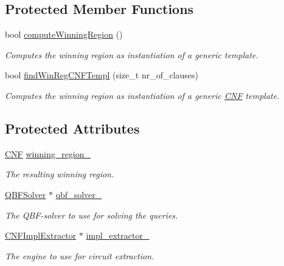\subsection*{Protected Member Functions}
\begin{DoxyCompactItemize}
\item 
bool \hyperlink{classTemplateSynth_ae334e4a6c30a324cfd4d0c05a32b191c}{compute\-Winning\-Region} ()
\begin{DoxyCompactList}\small\item\em Computes the winning region as instantiation of a generic template. \end{DoxyCompactList}\item 
bool \hyperlink{classTemplateSynth_a499d1c0069b41ce11a6c7e7679fd4ece}{find\-Win\-Reg\-C\-N\-F\-Templ} (size\-\_\-t nr\-\_\-of\-\_\-clauses)
\begin{DoxyCompactList}\small\item\em Computes the winning region as instantiation of a generic \hyperlink{classCNF}{C\-N\-F} template. \end{DoxyCompactList}\end{DoxyCompactItemize}
\subsection*{Protected Attributes}
\begin{DoxyCompactItemize}
\item 
\hyperlink{classCNF}{C\-N\-F} \hyperlink{classTemplateSynth_a4e147629eae6a542dd87d72902df68c8}{winning\-\_\-region\-\_\-}
\begin{DoxyCompactList}\small\item\em The resulting winning region. \end{DoxyCompactList}\item 
\hyperlink{classQBFSolver}{Q\-B\-F\-Solver} $\ast$ \hyperlink{classTemplateSynth_a08ec20197bf16a10546a7e6cf3719727}{qbf\-\_\-solver\-\_\-}
\begin{DoxyCompactList}\small\item\em The Q\-B\-F-\/solver to use for solving the queries. \end{DoxyCompactList}\item 
\hyperlink{classCNFImplExtractor}{C\-N\-F\-Impl\-Extractor} $\ast$ \hyperlink{classTemplateSynth_acfa25deb001fb3b6d49c0261bba98347}{impl\-\_\-extractor\-\_\-}
\begin{DoxyCompactList}\small\item\em The engine to use for circuit extraction. \end{DoxyCompactList}\end{DoxyCompactItemize}


